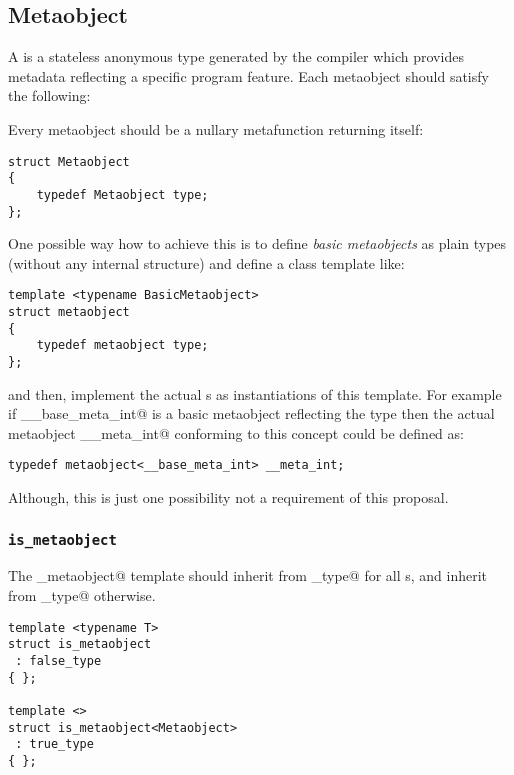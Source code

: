 \subsection{Metaobject}
\label{concept-Metaobject}


A  is a stateless anonymous type generated by the compiler which
provides metadata reflecting a specific program feature. Each metaobject
should satisfy the following:

Every metaobject should be a nullary metafunction returning itself:

\begin{verbatim}
struct Metaobject
{
	typedef Metaobject type;
};
\end{verbatim}

One possible way how to achieve this is to define {\em basic metaobjects}
as plain types (without any internal structure) and define a class template like:

\begin{verbatim}
template <typename BasicMetaobject>
struct metaobject
{
	typedef metaobject type;
};
\end{verbatim}

and then, implement the actual s as instantiations of this template.
For example if \verb@__base_meta_int@ is a basic metaobject reflecting the \verb@int@
type then the actual metaobject \verb@__meta_int@ conforming to this concept could 
be defined as:

\begin{verbatim}
typedef metaobject<__base_meta_int> __meta_int;
\end{verbatim}

Although, this is just one possibility not a requirement of this proposal.

\subsubsection{\texttt{is\_metaobject}}

The \verb@is_metaobject@ template should inherit from \verb@true_type@ for all s,
and inherit from \verb@false_type@ otherwise.

\begin{verbatim}
template <typename T>
struct is_metaobject
 : false_type
{ };

template <>
struct is_metaobject<Metaobject>
 : true_type
{ };
\end{verbatim}


